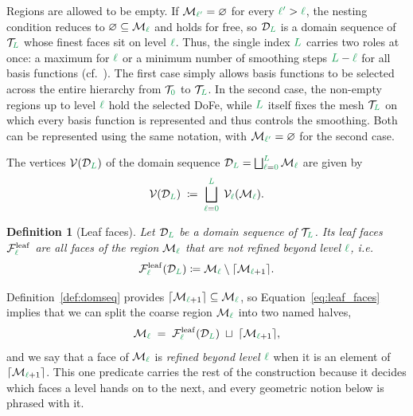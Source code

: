 \documentclass[a4paper, 12pt]{article}
\makeatletter
\newcommand{\guidance}[1]{{\color{lime!70!black} #1}}
\newcommand{\green}{\color{ForestGreen}}
\newcommand{\T}{\mathcal{T}}
\newcommand{\V}{\mathcal{V}}
\newcommand{\F}{\mathcal{F}}
\renewcommand{\l}{{\green\ell}}
\renewcommand{\L}{{\green L}}
\newcommand{\lzero}{{\green 0}}
\newcommand{\lone}{{\green {\l'}  }}
\newcommand{\M}{\mathcal{M}}
\newtheorem{definition}[theorem]{Definition}
\theoremstyle{definition}
\theoremstyle{plain}
\numberwithin{equation}{section}
\newcommand{\ancestorPatch}[1]{\lceil #1 \rceil}
\DeclareRobustCommand{\domseq}[1][]{\mathcal{D}\ifx\@empty#1\@empty\else_{#1}\fi}
\newcommand{\leafF}[1]{\F^{\mathrm{leaf}}_{#1}}             %
\makeatother
\begin{document}
Regions are allowed to be empty. If $\M_{\lone} = \varnothing$ for every $\lone > \l$, the nesting condition reduces to $\varnothing \subseteq \M_{\l}$ and holds for free, so $\domseq[\L]$ is a domain sequence of $\T_\L$ whose finest faces sit on level $\l$. Thus, the single index $\L$ carries two roles at once: a maximum for $\l$ or a minimum number of smoothing steps $\L-\l$ for all basis functions (cf.~\cite{Piel.2026}). The first case simply allows basis functions to be selected across the entire hierarchy from $\T_\lzero$ to $\T_\L$. In the second case, the non-empty regions up to level $\l$ hold the selected DoFe, while $\L$ itself fixes the mesh $\T_\L$ on which every basis function is represented and thus controls the smoothing. Both can be represented using the same notation, with $\M_{\lone} = \varnothing$ for the second case.

The vertices $\V(\domseq[\L])$ of the domain sequence $\domseq[\L] = \bigsqcup_{\l = \lzero}^{\L} \M_\l$ \guidance{are} given by
\begin{equation}
    \label{eq:vertices_of_domseq}
    \V(\domseq[\L]) \; \coloneq \; \bigsqcup\limits_{\l = \lzero}^{\L} \; \V_\l(\M_\l).
\end{equation}

\smallskip

\begin{definition}[Leaf faces]
    \label{def:leaf_faces}
    Let $\domseq[\L]$ be a domain sequence of $\T_\L$. Its \emph{leaf faces} $\leafF{\l}$ are all faces of the region $\M_\l$ that are not refined beyond level $\l$, i.e.
    \begin{equation}
        \label{eq:leaf_faces}
        \leafF{\l}(\domseq[\L]) \coloneq \M_\l \setminus \ancestorPatch{\M_{\l+1}}.
    \end{equation}
\end{definition}

Definition~\ref{def:domseq} provides $\ancestorPatch{\M_{\l+1}} \subseteq \M_\l$, so Equation~\eqref{eq:leaf_faces} implies that we can split the coarse region $\M_\l$ into two named halves,
\begin{equation}
    \label{eq:leaf_ancestor_split}
    \M_\l \; = \; \leafF{\l}(\domseq[\L]) \; \sqcup \; \ancestorPatch{\M_{\l+1}},
\end{equation}
and we say that a face of $\M_\l$ is \emph{refined beyond level $\l$} when it is an element of $\ancestorPatch{\M_{\l+1}}$. This one predicate carries the rest of the construction because it decides which faces a level hands on to the next, and every geometric notion below is phrased with it.
\end{document}
